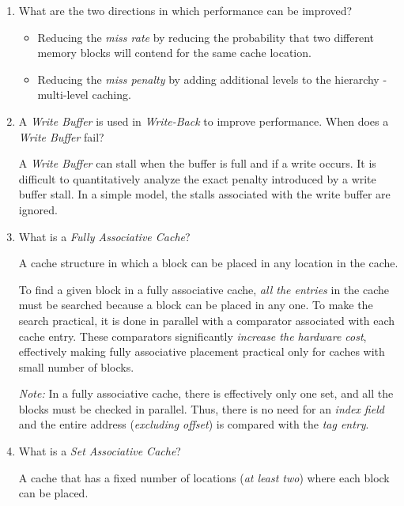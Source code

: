 \documentclass[12pt]{article}
\newenvironment{QandA}{\begin{enumerate}[label=\bfseries\arabic*.]\bfseries}
                      {\end{enumerate}}
\newenvironment{answered}{\par\quad\normalfont}{}
\begin{document}
\begin{QandA}
\item What are the two directions in which performance can be improved?
\begin{answered}
\vspace{-0.85cm}
\begin{itemize}
    \item Reducing the \textit{miss rate} by reducing the probability that two different memory blocks will contend for the same cache location.
    \item Reducing the \textit{miss penalty} by adding additional levels to the hierarchy - multi-level caching. 
\end{itemize}
\end{answered}

\item A \textit{Write Buffer} is used in \textit{Write-Back} to improve performance. When does a \textit{Write Buffer} fail?
\begin{answered}
A \textit{Write Buffer} can stall when the buffer is full and if a write occurs. It is difficult to quantitatively analyze the exact penalty introduced by a write buffer stall. In a simple model, the stalls associated with the write buffer are ignored. 
\end{answered}

\item What is a \textit{Fully Associative Cache}?
\begin{answered}
A cache structure in which a block can be placed in any location in the cache. 

\quad To find a given block in a fully associative cache, \textit{all the entries} in the cache must be searched because a block can be placed in any one. To make the search practical, it is done in parallel with a comparator associated with each cache entry. These comparators significantly \textit{increase the hardware cost}, effectively making fully associative placement practical only for caches with small number of blocks. 

\textit{Note:} In a fully associative cache, there is effectively only one set, and all the blocks must be checked in parallel. Thus, there is no need for an \textit{index field} and the entire address (\textit{excluding offset}) is compared with the \textit{tag entry}. 

\end{answered}

\item What is a \textit{Set Associative Cache}?
\begin{answered}
A cache that has a fixed number of locations (\textit{at least two}) where each block can be placed. 


\end{answered}
\end{QandA}
\end{document}
